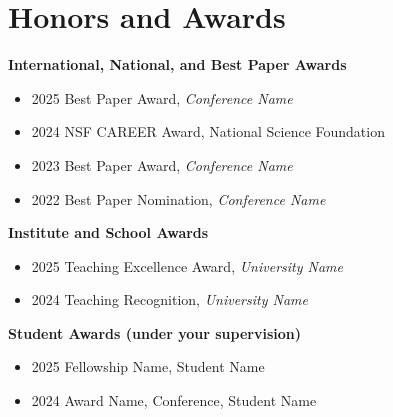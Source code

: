 \section{Honors and Awards}

\noindent\textbf{International, National, and Best Paper Awards}
\begin{itemize}
  \item 2025 \quad Best Paper Award, \textit{Conference Name}
  \item 2024 \quad NSF CAREER Award, National Science Foundation
  \item 2023 \quad Best Paper Award, \textit{Conference Name}
  \item 2022 \quad Best Paper Nomination, \textit{Conference Name}
\end{itemize}

\noindent\textbf{Institute and School Awards}
\begin{itemize}
  \item 2025 \quad Teaching Excellence Award, \textit{University Name}
  \item 2024 \quad Teaching Recognition, \textit{University Name}
\end{itemize}

\noindent\textbf{Student Awards (under your supervision)}
\begin{itemize}
  \item 2025 \quad Fellowship Name, Student Name
  \item 2024 \quad Award Name, Conference, Student Name
\end{itemize}
